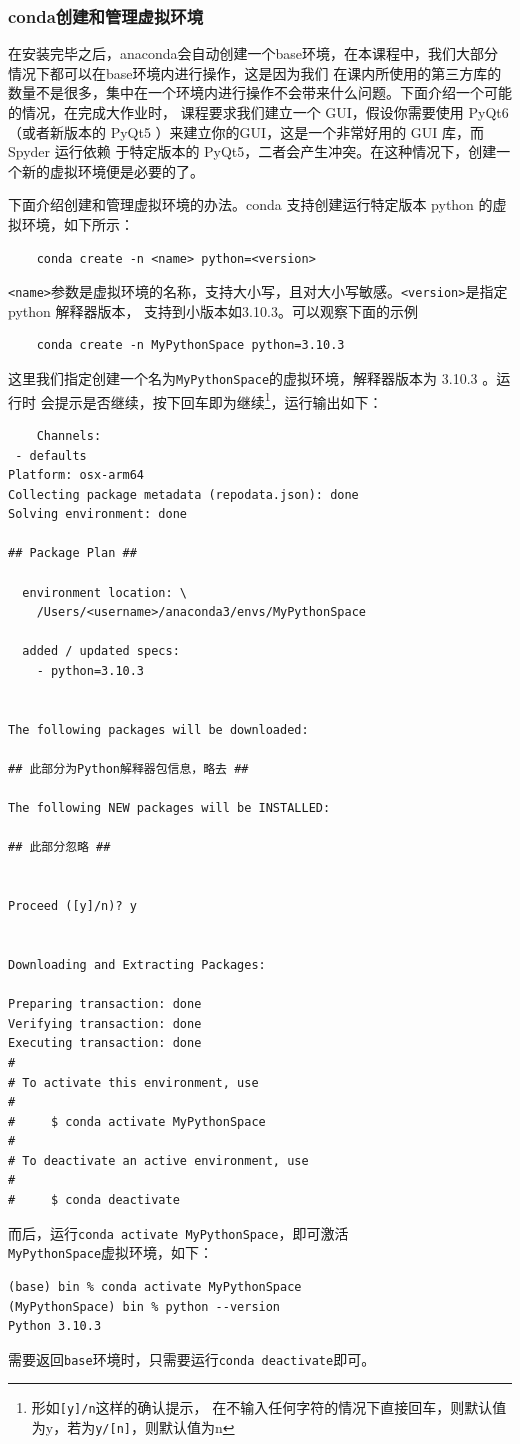 \subsubsection{conda创建和管理虚拟环境}
在安装完毕之后，anaconda会自动创建一个base环境，在本课程中，我们大部分情况下都可以在base环境内进行操作，这是因为我们
在课内所使用的第三方库的数量不是很多，集中在一个环境内进行操作不会带来什么问题。下面介绍一个可能的情况，在完成大作业时，
课程要求我们建立一个 GUI，假设你需要使用 PyQt6 （或者新版本的 PyQt5 ）来建立你的GUI，这是一个非常好用的 GUI 库，而 Spyder 运行依赖
于特定版本的 PyQt5，二者会产生冲突。在这种情况下，创建一个新的虚拟环境便是必要的了。

下面介绍创建和管理虚拟环境的办法。conda 支持创建运行特定版本 python 的虚拟环境，如下所示：
\begin{lstlisting}
    conda create -n <name> python=<version>
\end{lstlisting}
\texttt{<name>}参数是虚拟环境的名称，支持大小写，且对大小写敏感。\texttt{<version>}是指定 python 解释器版本，
支持到小版本如3.10.3。可以观察下面的示例
\begin{lstlisting}
    conda create -n MyPythonSpace python=3.10.3
\end{lstlisting}
这里我们指定创建一个名为\texttt{MyPythonSpace}的虚拟环境，解释器版本为 3.10.3 。运行时
会提示是否继续，按下回车即为继续\footnote{形如\texttt{[y]/n}这样的确认提示，
在不输入任何字符的情况下直接回车，则默认值为y，若为\texttt{y/[n]}，则默认值为n}，运行输出如下：
\begin{lstlisting}
    Channels:
 - defaults
Platform: osx-arm64
Collecting package metadata (repodata.json): done
Solving environment: done

## Package Plan ##

  environment location: \
    /Users/<username>/anaconda3/envs/MyPythonSpace

  added / updated specs:
    - python=3.10.3


The following packages will be downloaded:

## 此部分为Python解释器包信息，略去 ##

The following NEW packages will be INSTALLED:

## 此部分忽略 ##


Proceed ([y]/n)? y


Downloading and Extracting Packages:
                                                                                                            
Preparing transaction: done
Verifying transaction: done
Executing transaction: done
#
# To activate this environment, use
#
#     $ conda activate MyPythonSpace
#
# To deactivate an active environment, use
#
#     $ conda deactivate

\end{lstlisting}
而后，运行\texttt{conda activate MyPythonSpace}，即可激活\\\texttt{MyPythonSpace}虚拟环境，如下：
\begin{lstlisting}
(base) bin % conda activate MyPythonSpace
(MyPythonSpace) bin % python --version
Python 3.10.3
\end{lstlisting}
需要返回\texttt{base}环境时，只需要运行\texttt{conda deactivate}即可。

